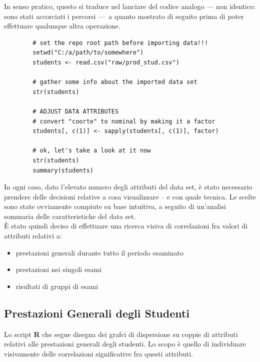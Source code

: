         In senso pratico, questo si traduce nel lanciare del codice analogo \footnotesize{--- non identico: sono stati accorciati i percorsi ---}\normalsize\ a quanto mostrato di seguito prima di poter effettuare qualunque altra operazione.

        \newpage

        \begin{lstlisting}
        # set the repo root path before importing data!!!
        setwd("C:/a/path/to/somewhere")
        students <- read.csv("raw/prod_stud.csv")

        # gather some info about the imported data set
        str(students)

        # ADJUST DATA ATTRIBUTES 
        # convert "coorte" to nominal by making it a factor 
        students[, c(1)] <- sapply(students[, c(1)], factor)

        # ok, let's take a look at it now
        str(students)
        summary(students)
        \end{lstlisting}

        In ogni caso, dato l’elevato numero degli attributi del data set, è stato necessario prendere delle decisioni relative a cosa visualizzare – e con quale tecnica. Le scelte sono state ovviamente compiute su base intuitiva, a seguito di un’analisi sommaria delle caratteristiche del data set. \\

        È stato quindi deciso di effettuare una ricerca visiva di correlazioni fra valori di attributi relativi a:

        \begin{itemize}
            \item prestazioni generali durante tutto il periodo esaminato
            \item prestazioni nei singoli esami
            \item risultati di gruppi di esami
        \end{itemize}

        \subsection{Prestazioni Generali degli Studenti}

            Lo script \textbf{R} che segue disegna dei grafci di dispersione su coppie di attributi relativi alle prestazioni generali degli studenti. Lo scopo è quello di individuare visivamente delle correlazioni significative fra questi attributi.\\

